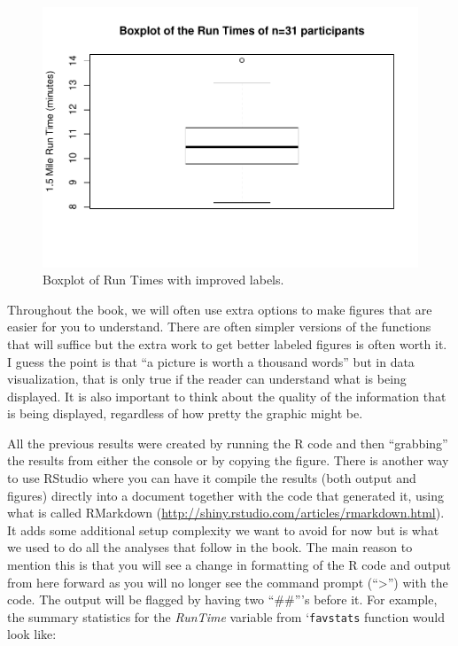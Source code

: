 \documentclass[]{book}
\begin{document}
\begin{figure}[htbp]
\centering
\includegraphics{GreenwoodBanner_files/figure-latex/Figure9-1.pdf}
\caption{\label{fig:Figure9}Boxplot of Run Times with improved labels.}
\end{figure}

Throughout the book, we will often use extra options to make figures
that are easier for you to understand. There are often simpler versions
of the functions that will suffice but the extra work to get better
labeled figures is often worth it. I guess the point is that ``a picture
is worth a thousand words'' but in data visualization, that is only true
if the reader can understand what is being displayed. It is also
important to think about the quality of the information that is being
displayed, regardless of how pretty the graphic might be.

All the previous results were created by running the R code and then
``grabbing'' the results from either the console or by copying the
figure. There is another way to use RStudio where you can have it
compile the results (both output and figures) directly into a document
together with the code that generated it, using what is called RMarkdown
(\url{http://shiny.rstudio.com/articles/rmarkdown.html}). It adds some
additional setup complexity we want to avoid for now but is what we used
to do all the analyses that follow in the book. The main reason to
mention this is that you will see a change in formatting of the R code
and output from here forward as you will no longer see the command
prompt (``\textgreater{}'') with the code. The output will be flagged by
having two ``\#\#'''s before it. For example, the summary statistics for
the \emph{RunTime} variable from `\texttt{favstats} function would look
like:
\end{document}
